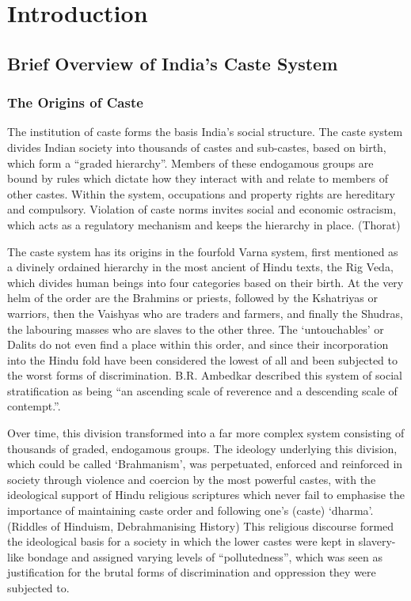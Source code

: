 \documentclass[12pt,a4paper,titlepage]{report}
\begin{document}
\chapter{Introduction}\label{introduction}

\section{Brief Overview of India's Caste
System}\label{brief-overview-of-indias-caste-system}

\subsection{The Origins of Caste}\label{the-origins-of-caste}

The institution of caste forms the basis India's social structure. The
caste system divides Indian society into thousands of castes and
sub-castes, based on birth, which form a ``graded hierarchy''. Members
of these endogamous groups are bound by rules which dictate how they
interact with and relate to members of other castes. Within the system,
occupations and property rights are hereditary and compulsory. Violation
of caste norms invites social and economic ostracism, which acts as a
regulatory mechanism and keeps the hierarchy in place. (Thorat)

The caste system has its origins in the fourfold Varna system, first
mentioned as a divinely ordained hierarchy in the most ancient of Hindu
texts, the Rig Veda, which divides human beings into four categories
based on their birth. At the very helm of the order are the Brahmins or
priests, followed by the Kshatriyas or warriors, then the Vaishyas who
are traders and farmers, and finally the Shudras, the labouring masses
who are slaves to the other three. The `untouchables' or Dalits do not
even find a place within this order, and since their incorporation into
the Hindu fold have been considered the lowest of all and been subjected
to the worst forms of discrimination. B.R. Ambedkar described this
system of social stratification as being ``an ascending scale of
reverence and a descending scale of contempt.''.

Over time, this division transformed into a far more complex system
consisting of thousands of graded, endogamous groups. The ideology
underlying this division, which could be called `Brahmanism', was
perpetuated, enforced and reinforced in society through violence and
coercion by the most powerful castes, with the ideological support of
Hindu religious scriptures which never fail to emphasise the importance
of maintaining caste order and following one's (caste) `dharma'.
(Riddles of Hinduism, Debrahmanising History) This religious discourse
formed the ideological basis for a society in which the lower castes
were kept in slavery-like bondage and assigned varying levels of
``pollutedness'', which was seen as justification for the brutal forms
of discrimination and oppression they were subjected to.
\end{document}
